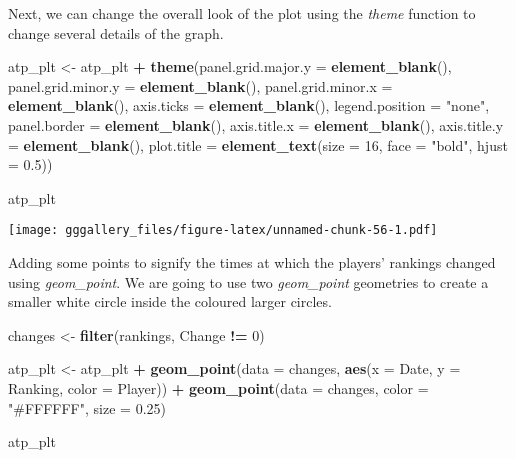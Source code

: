 \documentclass[]{book}
\newenvironment{Shaded}{\begin{snugshade}}{\end{snugshade}}
\newcommand{\DataTypeTok}[1]{\textcolor[rgb]{0.13,0.29,0.53}{#1}}
\newcommand{\DecValTok}[1]{\textcolor[rgb]{0.00,0.00,0.81}{#1}}
\newcommand{\FloatTok}[1]{\textcolor[rgb]{0.00,0.00,0.81}{#1}}
\newcommand{\KeywordTok}[1]{\textcolor[rgb]{0.13,0.29,0.53}{\textbf{#1}}}
\newcommand{\NormalTok}[1]{#1}
\newcommand{\OperatorTok}[1]{\textcolor[rgb]{0.81,0.36,0.00}{\textbf{#1}}}
\newcommand{\StringTok}[1]{\textcolor[rgb]{0.31,0.60,0.02}{#1}}
\begin{document}
Next, we can change the overall look of the plot using the \emph{theme} function to change several
details of the graph.

\begin{Shaded}
\begin{Highlighting}[]
\NormalTok{atp_plt <-}\StringTok{ }\NormalTok{atp_plt }\OperatorTok{+}\StringTok{ }
\StringTok{  }\KeywordTok{theme}\NormalTok{(}\DataTypeTok{panel.grid.major.y =} \KeywordTok{element_blank}\NormalTok{(), }\DataTypeTok{panel.grid.minor.y =} \KeywordTok{element_blank}\NormalTok{(),}
        \DataTypeTok{panel.grid.minor.x =} \KeywordTok{element_blank}\NormalTok{(), }\DataTypeTok{axis.ticks =} \KeywordTok{element_blank}\NormalTok{(), }
        \DataTypeTok{legend.position =} \StringTok{"none"}\NormalTok{, }\DataTypeTok{panel.border =} \KeywordTok{element_blank}\NormalTok{(),}
        \DataTypeTok{axis.title.x =} \KeywordTok{element_blank}\NormalTok{(), }\DataTypeTok{axis.title.y =} \KeywordTok{element_blank}\NormalTok{(),}
        \DataTypeTok{plot.title =} \KeywordTok{element_text}\NormalTok{(}\DataTypeTok{size =} \DecValTok{16}\NormalTok{, }\DataTypeTok{face =} \StringTok{"bold"}\NormalTok{, }\DataTypeTok{hjust =} \FloatTok{0.5}\NormalTok{)) }

\NormalTok{atp_plt}
\end{Highlighting}
\end{Shaded}

\texttt{[image: gggallery\_files/figure-latex/unnamed-chunk-56-1.pdf]}

Adding some points to signify the times at which the players' rankings changed using \emph{geom\_point}.
We are going to use two \emph{geom\_point} geometries to create a smaller white circle inside the coloured larger circles.

\begin{Shaded}
\begin{Highlighting}[]
\NormalTok{changes <-}\StringTok{ }\KeywordTok{filter}\NormalTok{(rankings, Change }\OperatorTok{!=}\StringTok{ }\DecValTok{0}\NormalTok{)}


\NormalTok{atp_plt <-}\StringTok{ }\NormalTok{atp_plt }\OperatorTok{+}\StringTok{ }\KeywordTok{geom_point}\NormalTok{(}\DataTypeTok{data =}\NormalTok{ changes, }\KeywordTok{aes}\NormalTok{(}\DataTypeTok{x =}\NormalTok{ Date, }\DataTypeTok{y =}\NormalTok{ Ranking, }\DataTypeTok{color =}\NormalTok{ Player)) }\OperatorTok{+}
\StringTok{  }\KeywordTok{geom_point}\NormalTok{(}\DataTypeTok{data =}\NormalTok{ changes, }\DataTypeTok{color =} \StringTok{"#FFFFFF"}\NormalTok{, }\DataTypeTok{size =} \FloatTok{0.25}\NormalTok{) }

\NormalTok{atp_plt}
\end{Highlighting}
\end{Shaded}
\end{document}
